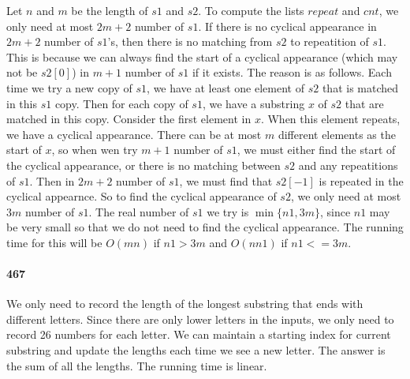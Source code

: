 \documentclass[11pt]{article}
\begin{document}
\begin{itemize}
Let $n$ and $m$ be the length of $s1$ and $s2$. To compute the lists $repeat$ and $cnt$, we only need at most $2m+2$ number of 
$s1$. If there is no cyclical appearance in $2m+2$ number of $s1$'s, then there is no matching from $s2$ to repeatition of $s1$.
This is because we can always find the start of a cyclical appearance (which may not be $s2[0]$) in $m+1$ number of $s1$ if it 
exists. The reason is as follows.
Each time we try a new copy of $s1$, we have at least one element of $s2$ that is matched in this $s1$ copy.
Then for each copy of $s1$, we have a substring $x$ of $s2$ that are matched in this copy. 
Consider the first element in $x$. When this element repeats, we have a cyclical appearance.
There can be at most $m$ different elements as the start of $x$, so when wen try $m+1$ number of $s1$, we must either find the
start of the cyclical appearance, or there is no matching between $s2$ and any repeatitions of $s1$. 
Then in $2m+2$ number of $s1$, we must find that $s2[-1]$ is repeated in the cyclical appearnce.
So to find the cyclical appearance of $s2$, we only need at most $3m$ number of $s1$.
The real number of $s1$ we try is $\min \{ n1, 3m\}$, since $n1$ may be very small so that we do not need to find the cyclical 
appearance. 
The running time for this will be $O(mn)$ if $n1 > 3m$ and $O(nn1)$ if $n1 <= 3m$.

\paragraph{467}
We only need to record the length of the longest substring that ends with different letters. Since there are only lower letters 
in the inputs, we only need to record 26 numbers for each letter. We can maintain a starting index for current substring and 
update the lengths each time we see a new letter. The answer is the sum of all the lengths. The running time is linear. 




\end{itemize}
\end{document}
